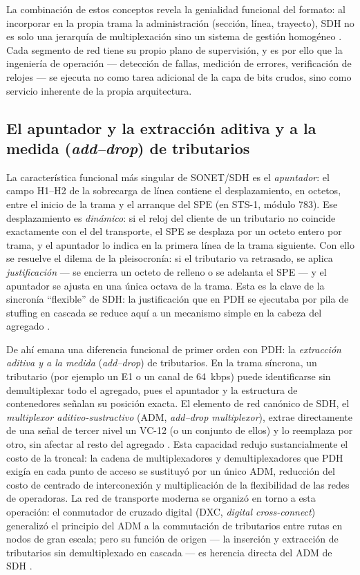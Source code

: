 \documentclass[12pt,a4paper]{article}
\begin{document}
La combinación de estos conceptos revela la genialidad funcional del formato: al incorporar en la propia trama la administración (sección, línea, trayecto), SDH no es solo una jerarquía de multiplexación sino un sistema de gestión homogéneo \cite{ituG803, stallings2004}. Cada segmento de red tiene su propio plano de supervisión, y es por ello que la ingeniería de operación --- detección de fallas, medición de errores, verificación de relojes --- se ejecuta no como tarea adicional de la capa de bits crudos, sino como servicio inherente de la propia arquitectura.

\subsection{El apuntador y la extracción aditiva y a la medida (\emph{add--drop}) de tributarios}

La característica funcional más singular de SONET/SDH es el \emph{apuntador}: el campo H1--H2 de la sobrecarga de línea contiene el desplazamiento, en octetos, entre el inicio de la trama y el arranque del SPE (en STS-1, módulo 783). Ese desplazamiento es \emph{dinámico}: si el reloj del cliente de un tributario no coincide exactamente con el del transporte, el SPE se desplaza por un octeto entero por trama, y el apuntador lo indica en la primera línea de la trama siguiente. Con ello se resuelve el dilema de la pleisocronía: si el tributario va retrasado, se aplica \emph{justificación} --- se encierra un octeto de relleno o se adelanta el SPE --- y el apuntador se ajusta en una única octava de la trama. Esta es la clave de la sincronía ``flexible'' de SDH: la justificación que en PDH se ejecutaba por pila de stuffing en cascada se reduce aquí a un mecanismo simple en la cabeza del agregado \cite{itug707, stallings2004}.

De ahí emana una diferencia funcional de primer orden con PDH: la \emph{extracción aditiva y a la medida} (\emph{add--drop}) de tributarios. En la trama síncrona, un tributario (por ejemplo un E1 o un canal de 64~kbps) puede identificarse sin demultiplexar todo el agregado, pues el apuntador y la estructura de contenedores señalan su posición exacta. El elemento de red canónico de SDH, el \emph{multiplexor aditivo-sustractivo} (ADM, \emph{add--drop multiplexor}), extrae directamente de una señal de tercer nivel un VC-12 (o un conjunto de ellos) y lo reemplaza por otro, sin afectar al resto del agregado \cite{tanenbaum2012, stallings2004}. Esta capacidad redujo sustancialmente el costo de la troncal: la cadena de multiplexadores y demultiplexadores que PDH exigía en cada punto de acceso se sustituyó por un único ADM, reducción del costo de centrado de interconexión y multiplicación de la flexibilidad de las redes de operadoras. La red de transporte moderna se organizó en torno a esta operación: el conmutador de cruzado digital (DXC, \emph{digital cross-connect}) generalizó el principio del ADM a la commutación de tributarios entre rutas en nodos de gran escala; pero su función de origen --- la inserción y extracción de tributarios sin demultiplexado en cascada --- es herencia directa del ADM de SDH \cite{tanenbaum2012}.
\end{document}
